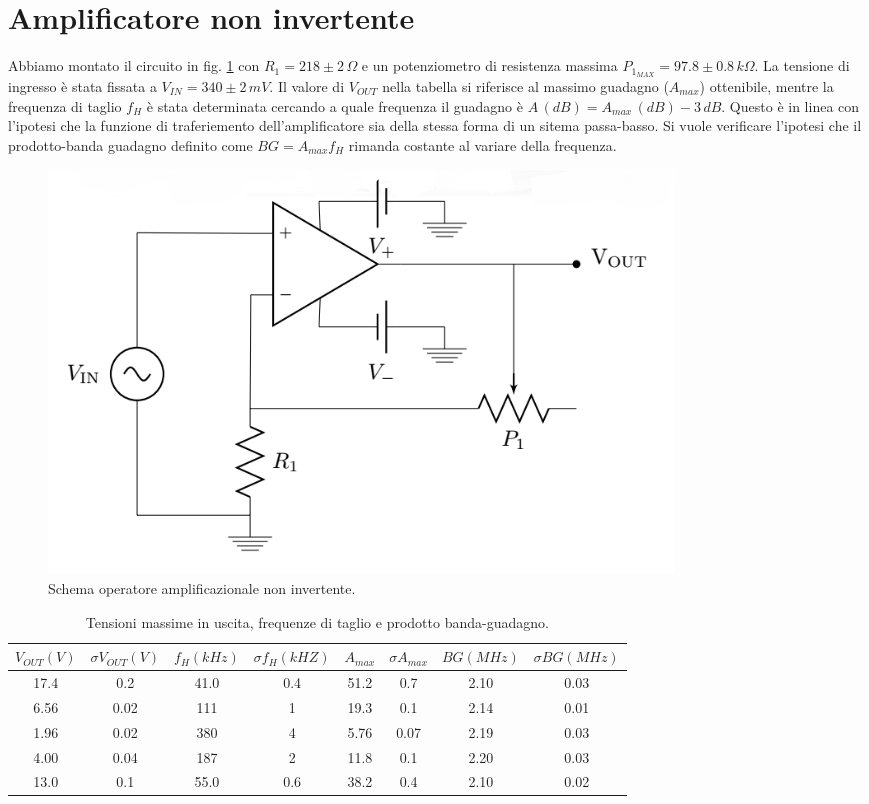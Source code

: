 \documentclass[10pt,a4paper]{article}
\begin{document}
\section{Amplificatore non invertente}
Abbiamo montato il circuito in fig. \ref{opampnoninvert} con $R_1=218 \pm 2 \,  \Omega$ e  un potenziometro di resistenza massima $P_{1_{MAX}}= 97.8 \pm 0.8 \, k\Omega$. La tensione di ingresso è stata fissata a $V_{IN} = 340 \pm 2 \, mV$.
Il valore di $V_{OUT}$ nella tabella si riferisce al massimo guadagno ($A_{max}$) ottenibile, mentre la frequenza di taglio $f_H$ è stata determinata cercando a quale frequenza il  guadagno è $A\,(dB)= A_{max}\,(dB) - 3 \,dB$. Questo  è in linea con l'ipotesi che la funzione di traferiemento dell'amplificatore  sia della stessa forma di un sitema passa-basso. Si vuole verificare l'ipotesi che il prodotto-banda guadagno definito come $BG = A_{max} f_H$ rimanda costante al variare della frequenza. 

\begin{figure}[!htb]
  \centering
  \includegraphics[scale=0.5]{opampnoninvert.png}
\caption{Schema operatore amplificazionale non invertente.}
\label{opampnoninvert}
\end{figure}

\begin{table}[!htb]\centering
\begin{tabular}{|c|c|c|c|c|c|c|c|}
\hline
$V_{OUT} (V)$ & $\sigma V_{OUT} (V)$ & $ f_H(kHz) $ & $ \sigma f_H(kHZ)$ & $A_{max}$ & $\sigma A_{max}$ & $BG (MHz)$ & $\sigma BG (MHz)$\\    
\hline
17.4 & 0.2 & 41.0 & 0.4 & 51.2 & 0.7 & 2.10 & 0.03\\
6.56 & 0.02 & 111 & 1 & 19.3 & 0.1 & 2.14 & 0.01\\
1.96 & 0.02 & 380 & 4 & 5.76 & 0.07 & 2.19 & 0.03\\
4.00 & 0.04 & 187 & 2 & 11.8 & 0.1 & 2.20 & 0.03\\
13.0 & 0.1 & 55.0 & 0.6 & 38.2 & 0.4 & 2.10 & 0.02\\
\hline
\end{tabular}
\caption{Tensioni massime in uscita, frequenze di taglio e prodotto banda-guadagno.}
\label{Inserire la label}
\end{table}
\end{document}
